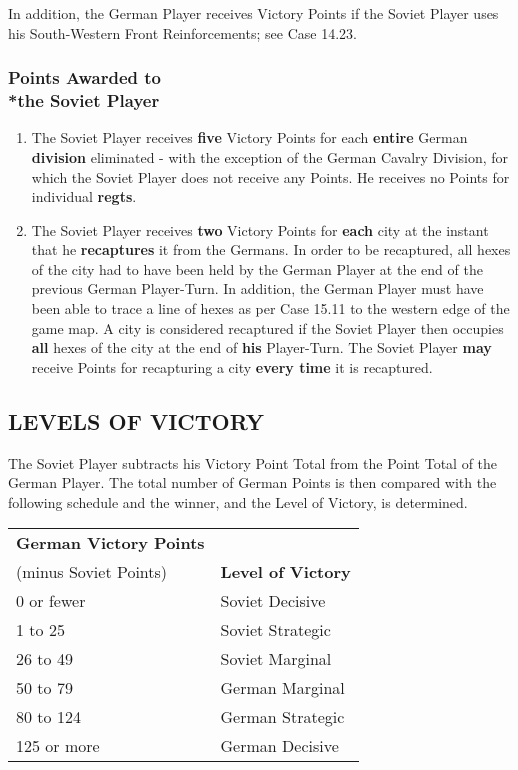 In addition, the German Player receives Victory Points if the Soviet Player uses his South-Western Front Reinforcements; see Case 14.23.

\subsubsection{Points Awarded to\\*the Soviet Player}

\begin{enumerate}
  \item The Soviet Player receives \textbf{five} Victory Points for each \textbf{entire} German \textbf{division} eliminated - with the exception of the German Cavalry Division, for which the Soviet Player does not receive any Points. He receives no Points for individual \textbf{regts}.
  \item The Soviet Player receives \textbf{two} Victory Points for \textbf{each} city at the instant that he \textbf{recaptures} it from the Germans. In order to be recaptured, all hexes of the city had to have been held by the German Player at the end of the previous German Player-Turn. In addition, the German Player must have been able to trace a line of hexes as per Case 15.11 to the western edge of the game map. A city is considered recaptured if the Soviet Player then occupies \textbf{all} hexes of the city at the end of \textbf{his} Player-Turn. The Soviet Player \textbf{may} receive Points for recapturing a city \textbf{every time} it is recaptured.
\end{enumerate}

\subsection{LEVELS OF VICTORY}

The Soviet Player subtracts his Victory Point Total from the Point Total of the German Player. The total number of German Points is then compared with the following schedule and the winner, and the Level of Victory, is determined.

\begin{tabular}{ll}
  \textbf{German Victory Points} &\\
  (minus Soviet Points) & \textbf{Level of Victory}\\
  0 or fewer & Soviet Decisive\\
  1 to 25 & Soviet Strategic\\
  26 to 49 & Soviet Marginal\\
  50 to 79 & German Marginal\\
  80 to 124 & German Strategic\\
  125 or more & German Decisive
\end{tabular}